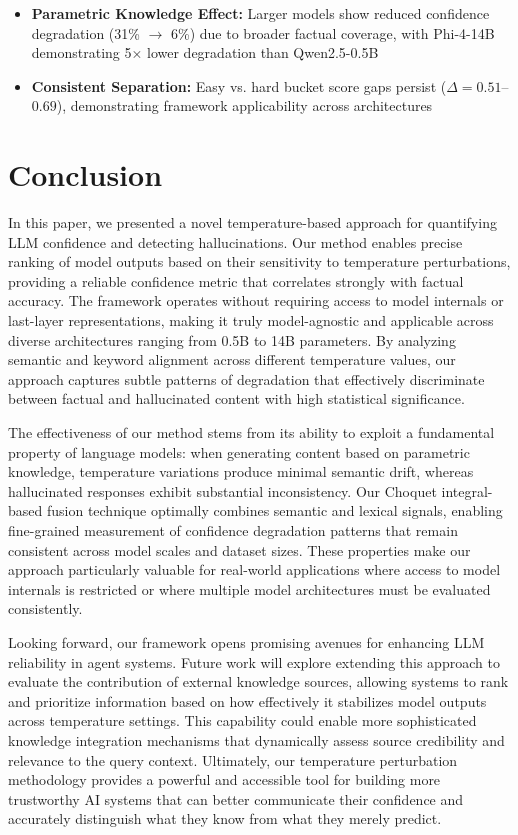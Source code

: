 \documentclass[sigconf]{acmart}
\begin{document}
\begin{itemize}
    \item \textbf{Parametric Knowledge Effect:} Larger models show reduced confidence degradation (31\% $\rightarrow$ 6\%) due to broader factual coverage, with Phi-4-14B demonstrating 5× lower degradation than Qwen2.5-0.5B
    \item \textbf{Consistent Separation:} Easy vs. hard bucket score gaps persist ($\Delta = 0.51$--$0.69$), demonstrating framework applicability across architectures
\end{itemize}


\section{Conclusion}

In this paper, we presented a novel temperature-based approach for quantifying LLM confidence and detecting hallucinations. Our method enables precise ranking of model outputs based on their sensitivity to temperature perturbations, providing a reliable confidence metric that correlates strongly with factual accuracy. The framework operates without requiring access to model internals or last-layer representations, making it truly model-agnostic and applicable across diverse architectures ranging from 0.5B to 14B parameters. By analyzing semantic and keyword alignment across different temperature values, our approach captures subtle patterns of degradation that effectively discriminate between factual and hallucinated content with high statistical significance.

The effectiveness of our method stems from its ability to exploit a fundamental property of language models: when generating content based on parametric knowledge, temperature variations produce minimal semantic drift, whereas hallucinated responses exhibit substantial inconsistency. Our Choquet integral-based fusion technique optimally combines semantic and lexical signals, enabling fine-grained measurement of confidence degradation patterns that remain consistent across model scales and dataset sizes. These properties make our approach particularly valuable for real-world applications where access to model internals is restricted or where multiple model architectures must be evaluated consistently.

Looking forward, our framework opens promising avenues for enhancing LLM reliability in agent systems. Future work will explore extending this approach to evaluate the contribution of external knowledge sources, allowing systems to rank and prioritize information based on how effectively it stabilizes model outputs across temperature settings. This capability could enable more sophisticated knowledge integration mechanisms that dynamically assess source credibility and relevance to the query context. Ultimately, our temperature perturbation methodology provides a powerful and accessible tool for building more trustworthy AI systems that can better communicate their confidence and accurately distinguish what they know from what they merely predict.
\end{document}
